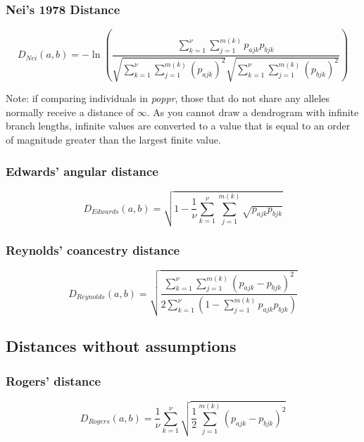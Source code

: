 \documentclass[letterpaper]{article}\usepackage[]{graphicx}\usepackage[]{color}
\newcommand{\poppr}{\textit{poppr}}
\begin{document}
\subsubsection{Nei's 1978 Distance}
\label{distance:nei}
\begin{equation}
  D_{Nei}(a,b)= -\ln\left(\frac{\sum_{k=1}^{\nu} \sum_{j=1}^{m(k)}
  p_{ajk} p_{bjk}}{\sqrt{\sum_{k=1}^{\nu} \sum_{j=1}^{m(k)}
  {(p_{ajk}) }^2}\sqrt{\sum_{k=1}^{\nu} \sum_{j=1}^{m(k)}
  {(p_{bjk})}^2}}\right)
\end{equation}

Note: if comparing individuals in \poppr{}, those that do not share any alleles
normally receive a distance of $\infty$. As you cannot draw a dendrogram with 
infinite branch lengths, infinite values are converted to a value that is equal
to an order of magnitude greater than the largest finite value.

\subsubsection{Edwards' angular distance}
\label{distance:edwards}
\begin{equation}
  D_{Edwards}(a,b)=\sqrt{1-\frac{1}{\nu} \sum_{k=1}^{\nu}
  \sum_{j=1}^{m(k)} \sqrt{p_{ajk}  p_{bjk}}}
\end{equation}

\subsubsection{Reynolds' coancestry distance}
\label{distance:reynolds}
\begin{equation}
  D_{Reynolds}(a,b)=\sqrt{\frac{\sum_{k=1}^{\nu}
  \sum_{j=1}^{m(k)}{(p_{ajk} - p_{bjk})}^2}{2 \sum_{k=1}^{\nu} \left(1-
  \sum_{j=1}^{m(k)}p_{ajk} p_{bjk}\right)}}
\end{equation}

\subsection{Distances without assumptions}
\subsubsection{Rogers' distance}
\label{distance:rogers}
\begin{equation}
  D_{Rogers}(a,b)=\frac{1}{\nu} \sum_{k=1}^{\nu} \sqrt{\frac{1}{2}
  \sum_{j=1}^{m(k)}{(p_{ajk} - p_{bjk})}^2}
\end{equation}
\end{document}
